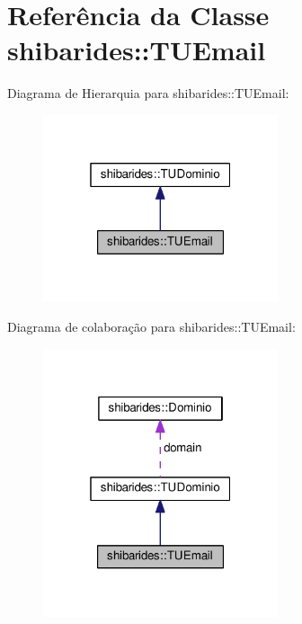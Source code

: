 \hypertarget{classshibarides_1_1TUEmail}{}\section{Referência da Classe shibarides\+:\+:T\+U\+Email}
\label{classshibarides_1_1TUEmail}


Diagrama de Hierarquia para shibarides\+:\+:T\+U\+Email\+:\nopagebreak
\begin{figure}[H]
\begin{center}
\leavevmode
\includegraphics[width=196pt]{classshibarides_1_1TUEmail__inherit__graph}
\end{center}
\end{figure}


Diagrama de colaboração para shibarides\+:\+:T\+U\+Email\+:\nopagebreak
\begin{figure}[H]
\begin{center}
\leavevmode
\includegraphics[width=196pt]{classshibarides_1_1TUEmail__coll__graph}
\end{center}
\end{figure}
